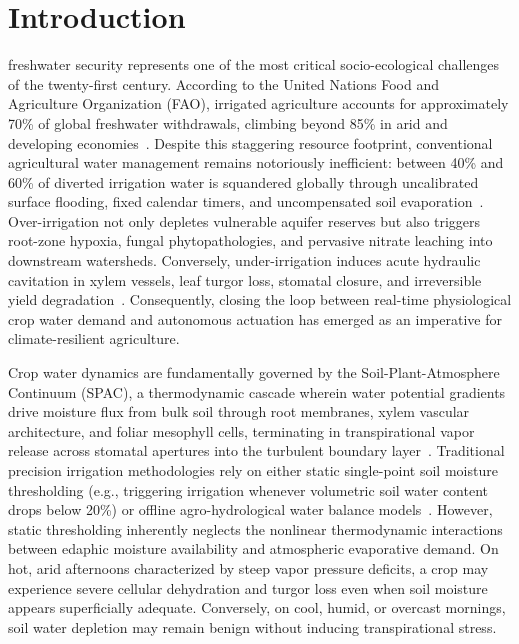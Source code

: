 \section{Introduction}
\label{sec:introduction}

 freshwater security represents one of the most critical socio-ecological challenges of the twenty-first century. According to the United Nations Food and Agriculture Organization (FAO), irrigated agriculture accounts for approximately 70\% of global freshwater withdrawals, climbing beyond 85\% in arid and developing economies~\cite{allen1998crop, ahmad2024ai}. Despite this staggering resource footprint, conventional agricultural water management remains notoriously inefficient: between 40\% and 60\% of diverted irrigation water is squandered globally through uncalibrated surface flooding, fixed calendar timers, and uncompensated soil evaporation~\cite{jones2004irrigation, olatinwo2025review}. Over-irrigation not only depletes vulnerable aquifer reserves but also triggers root-zone hypoxia, fungal phytopathologies, and pervasive nitrate leaching into downstream watersheds. Conversely, under-irrigation induces acute hydraulic cavitation in xylem vessels, leaf turgor loss, stomatal closure, and irreversible yield degradation~\cite{jackson1981canopy, xu2026turgor}. Consequently, closing the loop between real-time physiological crop water demand and autonomous actuation has emerged as an imperative for climate-resilient agriculture.

Crop water dynamics are fundamentally governed by the Soil-Plant-Atmosphere Continuum (SPAC), a thermodynamic cascade wherein water potential gradients drive moisture flux from bulk soil through root membranes, xylem vascular architecture, and foliar mesophyll cells, terminating in transpirational vapor release across stomatal apertures into the turbulent boundary layer~\cite{monteith1965evaporation, idso1981normalizing}. Traditional precision irrigation methodologies rely on either static single-point soil moisture thresholding (e.g., triggering irrigation whenever volumetric soil water content drops below 20\%) or offline agro-hydrological water balance models~\cite{allen1998crop}. However, static thresholding inherently neglects the nonlinear thermodynamic interactions between edaphic moisture availability and atmospheric evaporative demand. On hot, arid afternoons characterized by steep vapor pressure deficits, a crop may experience severe cellular dehydration and turgor loss even when soil moisture appears superficially adequate. Conversely, on cool, humid, or overcast mornings, soil water depletion may remain benign without inducing transpirational stress.

